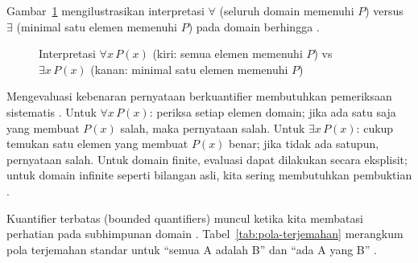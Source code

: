 Gambar~\ref{fig:forall-vs-exists} mengilustrasikan interpretasi $\forall$ (seluruh domain memenuhi $P$) versus $\exists$ (minimal satu elemen memenuhi $P$) pada domain berhingga \cite{berkeley_fol,brilliant_quantifiers}.

\begin{figure}[htbp]
\centering
{}
\caption{Interpretasi $\forall x \, P(x)$ (kiri: semua elemen memenuhi $P$) vs $\exists x \, P(x)$ (kanan: minimal satu elemen memenuhi $P$)}
\label{fig:forall-vs-exists}
\end{figure}

Mengevaluasi kebenaran pernyataan berkuantifier membutuhkan pemeriksaan sistematis \cite{levin_discrete,rosen2019}. Untuk $\forall x \, P(x)$: periksa setiap elemen domain; jika ada satu saja yang membuat $P(x)$ salah, maka pernyataan salah. Untuk $\exists x \, P(x)$: cukup temukan satu elemen yang membuat $P(x)$ benar; jika tidak ada satupun, pernyataan salah. Untuk domain finite, evaluasi dapat dilakukan secara eksplisit; untuk domain infinite seperti bilangan asli, kita sering membutuhkan pembuktian \cite{stanford_intrologic,iep_predicate}.

Kuantifier terbatas (bounded quantifiers) muncul ketika kita membatasi perhatian pada subhimpunan domain \cite{forallx,rosen2019}. Tabel~\ref{tab:pola-terjemahan} merangkum pola terjemahan standar untuk ``semua A adalah B'' dan ``ada A yang B'' \cite{stanford_intrologic,berkeley_fol}.

